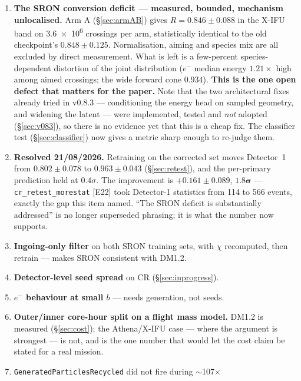\documentclass[11pt,a4paper]{article}
\newcommand{\ev}[1]{{\footnotesize\textcolor{prov}{[#1]}}}
\begin{document}
\begin{enumerate}[nosep]
  \item \textbf{The SRON conversion deficit --- measured, bounded, mechanism
        unlocalised.} Arm A (\S\ref{sec:armAB}) gives $R = 0.846 \pm 0.088$ in
        the X-IFU band on \num{3.6e6} crossings per arm, statistically identical
        to the old checkpoint's $0.848 \pm 0.125$. Normalisation, aiming and
        species mix are all excluded by direct measurement. What is left is a
        few-percent species-dependent distortion of the joint distribution
        ($e^{-}$ median energy $1.21\times$ high among aimed crossings; the wide
        forward cone $0.934$). \textbf{This is the one open defect that matters
        for the paper.} Note that the two architectural fixes already tried in
        v0.8.3 --- conditioning the energy head on sampled geometry, and widening
        the latent --- were implemented, tested and \emph{not} adopted
        (\S\ref{sec:v083}), so there is no evidence yet that this is a cheap fix.
        The classifier test (\S\ref{sec:classifier}) now gives a metric sharp
        enough to re-judge them.
  \item \textbf{Resolved 21/08/2026.} Retraining on the corrected set moves
        Detector~1 from $0.802 \pm 0.078$ to $\mathbf{0.963 \pm 0.043}$
        (\S\ref{sec:retest}), and the per-primary prediction held at
        $0.4\sigma$. The improvement is $+0.161 \pm 0.089$, $\mathbf{1.8\sigma}$
        --- \texttt{cr\_retest\_morestat} \ev{E22} took Detector-1 statistics
        from 114 to 566 events, exactly the gap this item named. ``The SRON
        deficit is substantially addressed'' is no longer superseded phrasing;
        it is what the number now supports.
  \item \textbf{Ingoing-only filter} on both SRON training sets, with $\chi$
        recomputed, then retrain --- makes SRON consistent with DM1.2.
  \item \textbf{Detector-level seed spread} on CR (\S\ref{sec:inprogress}).
  \item \textbf{$e^{-}$ behaviour at small $b$} --- needs generation, not seeds.
  \item \textbf{Outer/inner core-hour split on a flight mass model.} DM1.2 is
        measured (\S\ref{sec:cost}); the Athena/X-IFU case --- where the
        argument is strongest --- is not, and is the one number that would let
        the cost claim be stated for a real mission.
  \item \texttt{GeneratedParticlesRecycled} did not fire during $\sim$107$\times$

\end{enumerate}
\end{document}
